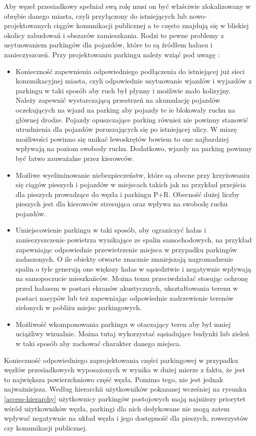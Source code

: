 \documentclass[twoside,12pt]{article}
\begin{document}
	Aby węzeł przesiadkowy spełniał swą rolę musi on być właściwie zlokalizowany w obrębie danego miasta, czyli przyłączony do istniejących lub nowo-projektowanych ciągów komunikacji publicznej a te często znajdują się w bliskiej okolicy zabudowań i obszarów zamieszkania. Rodzi to pewne problemy z usytuowaniem parkingów dla pojazdów, które to są źródłem hałasu i zanieczyszczeń. Przy projektowaniu parkingu należy wziąć pod uwagę \cite{projektowanie_obiektow_motoryzacyjnych}:
	\begin{itemize}
		\item Konieczność zapewnienia odpowiedniego podłączenia do istniejącej już sieci komunikacyjnej miasta, czyli odpowiednie usytuowanie wjazdów i wyjazdów z parkingu w taki sposób aby ruch był płynny i możliwie mało kolizyjny. Należy zapewnić wystarczającą przestrzeń na akumulację pojazdów oczekujących na wjazd na parking aby pojazdy te ie blokowały ruchu na głównej drodze. Pojazdy opuszczające parking również nie powinny stanowić utrudnienia dla pojazdów poruszających się po istniejącej ulicy. W miarę możliwości powinno się unikać lewoskrętów bowiem to one najbardziej wpływają na poziom swobody ruchu. Dodatkowo, wjazdy na parking powinny być łatwo zauważalne przez kierowców.
		\item Możliwe wyeliminowanie niebezpieczeństw, które są obecne przy krzyżowaniu się ciągów pieszych i pojazdów w miejscach takich jak na przykład przejścia dla pieszych prowadzące do węzła i parkingu P+R. Obecność dużej liczby pieszych jest dla kierowców stresująca oraz wpływa na swobodę ruchu pojazdów. 
		\item Umiejscowienie parkingu w taki sposób, aby ograniczyć hałas i zanieczyszczenie powietrza wynikające ze spalin samochodowych, na przykład zapewniając odpowiednie przewietrzenie miejsca w przypadku parkingów zadaszonych. O ile obiekty otwarte znacznie zmniejszają nagromadzenie spalin o tyle generują one większy hałas w sąsiedztwie i negatywnie wpływają na samopoczucie mieszkańców. Można temu przeciwdziałać stosując ochronę przed hałasem w postaci ekranów akustycznych, ukształtowania terenu w postaci nasypów lub też zapewniając odpowiednie zadrzewienie terenów zielonych w pobliżu miejsc parkingowych.
		\item Możliwość wkomponowania parkingu w otaczający teren aby był mniej uciążliwy wizualnie. Można tutaj wykorzystać sąsiadujące budynki lub zieleń w taki sposób aby zachować charakter danego miejsca.
	\end{itemize}
	
	Konieczność odpowiedniego zaprojektowania części parkingowej w przypadku węzłów przesiadkowych wyposażonych w \pnr{} wynika w dużej mierze z faktu, że jest to największa powierzchniowo część węzła. Pomimo tego, nie jest jednak najważniejsza. Według hierarchii użytkowników pokazanej wcześniej na rysunku \ref{access-hierarchy} użytkownicy parkingów postojowych mają najniższy priorytet wśród użytkowników węzła, parkingi dla nich dedykowane nie mogą zatem wpływać negatywnie na układ węzła i jego dostępność dla pieszych, rowerzystów czy komunikacji publicznej. 
	
\end{document}

